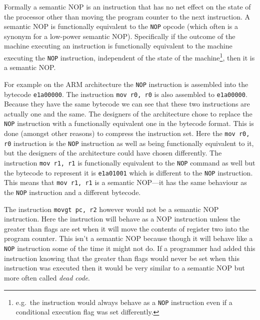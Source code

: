 \documentclass[10pt,]{book}
\begin{document}
Formally a semantic NOP is an instruction that has no net effect on the
state of the processor other than moving the program counter to the next
instruction. A semantic NOP is functionally equivalent to the
\lstinline!NOP! opcode (which often is a synonym for a low-power
semantic NOP). Specifically if the outcome of the machine executing an
instruction is functionally equivalent to the machine executing the
\lstinline!NOP! instruction, independent of the state of the
machine\footnote{e.g.~the instruction would always behave as a
  \lstinline!NOP! instruction even if a conditional execution flag was
  set differently.}, then it is a semantic NOP.

For example on the ARM architecture\autocite{Seal:2000vd} the
\lstinline!NOP! instruction is assembled into the bytecode
\lstinline!e1a00000!. The instruction \lstinline!mov r0, r0! is also
assembled to \lstinline!e1a00000!. Because they have the same bytecode
we can see that these two instructions are actually one and the same.
The designers of the architecture chose to replace the \lstinline!NOP!
instruction with a functionally equivalent one in the bytecode format.
This is done (amongst other reasons) to compress the instruction set.
Here the \lstinline!mov r0, r0! instruction is the \lstinline!NOP!
instruction as well as being functionally equivalent to it, but the
designers of the architecture could have chosen differently. The
instruction \lstinline!mov r1, r1! is functionally equivalent to the
\lstinline!NOP! command as well but the bytecode to represent it is
\lstinline!e1a01001! which is different to the \lstinline!NOP!
instruction. This means that \lstinline!mov r1, r1! is a semantic
NOP---it has the same behaviour as the \lstinline!NOP! instruction and a
different bytecode.

The instruction \lstinline!movgt pc, r2! however would not be a semantic
NOP instruction. Here the instruction will behave as a NOP instruction
unless the greater than flags are set when it will move the contents of
register two into the program counter. This isn't a semantic NOP because
though it will behave like a \lstinline!NOP! instruction some of the
time it might not do. If a programmer had added this instruction knowing
that the greater than flags would never be set when this instruction was
executed then it would be very similar to a semantic NOP but more often
called \emph{dead code}\autocite{Collberg:1997vt}.
\end{document}
